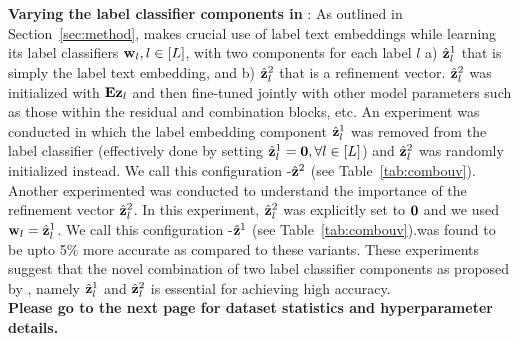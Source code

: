 \textbf{Varying the label classifier components in \alg}: As outlined in Section~\ref{sec:method}, \alg makes crucial use of label text embeddings while learning its label classifiers $\protect{\mathbf{w}}_l, l \in [L]$, with two components for each label $l$ a) $\hat{\protect{\mathbf{z}}}^1_l$ that is simply the label text embedding, and b) $\hat{\protect{\mathbf{z}}}^2_l$ that is a refinement vector. $\hat{\protect{\mathbf{z}}}^2_l$ was  initialized with $\protect{\mathbf{E}}\protect{\mathbf{z}}_l$ and then fine-tuned jointly with other model parameters such as those within the residual and combination blocks, etc. An experiment was conducted in which the label embedding component $\hat{\protect{\mathbf{z}}}^1_l$ was removed from the label classifier (effectively done by setting $\hat{\protect{\mathbf{z}}}^1_l = \protect{\mathbf{0}}, \forall l \in [L]$) and $\hat{\protect{\mathbf{z}}}^2_l$ was randomly initialized instead. We call this configuration \alg-$\hat{\protect{\mathbf{z}}}^2$ (see Table~\ref{tab:combouv}). Another experimented was conducted to understand the importance of the refinement vector $\hat{\protect{\mathbf{z}}}^2_l$. In this experiment, $\hat{\protect{\mathbf{z}}}^2_l$ was explicitly set to $\protect{\mathbf{0}}$ and we used $\protect{\mathbf{w}}_l = \hat{\protect{\mathbf{z}}}^1_l$. We call this configuration \alg-$\hat{\protect{\mathbf{z}}}^1$ (see Table~\ref{tab:combouv}).\alg was found to be upto 5\% more accurate as compared to these variants. These experiments suggest that the novel combination of two label classifier components as proposed by \alg, namely $\hat{\protect{\mathbf{z}}}^1_l$ and $\hat{\protect{\mathbf{z}}}^2_l$ is essential for achieving high accuracy.\\

\noindent\textbf{Please go to the next page for dataset statistics and hyperparameter details.}